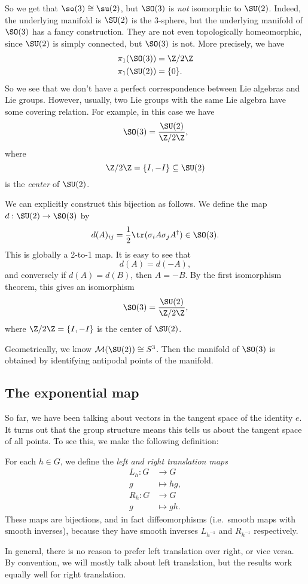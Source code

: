 \documentclass[a4paper]{article}
\begin{document}
So we get that $\so(3) \cong \su(2)$, but $\SO(3)$ is \emph{not} isomorphic to $\SU(2)$. Indeed, the underlying manifold is $\SU(2)$ is the $3$-sphere, but the underlying manifold of $\SO(3)$ has a fancy construction. They are not even topologically homeomorphic, since $\SU(2)$ is simply connected, but $\SO(3)$ is not. More precisely, we have
\begin{align*}
  \pi_1(\SO(3)) &= \Z/2\Z\\
  \pi_1(\SU(2)) &= \{0\}.
\end{align*}
So we see that we don't have a perfect correspondence between Lie algebras and Lie groups. However, usually, two Lie groups with the same Lie algebra have some covering relation. For example, in this case we have
\[
  \SO(3) = \frac{\SU(2)}{\Z/2\Z},
\]
where
\[
  \Z/2\Z = \{I, -I\} \subseteq \SU(2)
\]
is the \emph{center} of $\SU(2)$.

We can explicitly construct this bijection as follows. We define the map $d: \SU(2) \to \SO(3)$ by
\[
  d(A)_{ij} = \frac{1}{2} \tr (\sigma_i A\sigma_j A^\dagger) \in \SO(3).
\]
This is globally a 2-to-1 map. It is easy to see that
\[
  d(A) = d(-A),
\]
and conversely if $d(A) = d(B)$, then $A = -B$. By the first isomorphism theorem, this gives an isomorphism
\[
  \SO(3) = \frac{\SU(2)}{\Z/2\Z},
\]
where $\Z/2\Z = \{I, -I\}$ is the center of $\SU(2)$.

Geometrically, we know $\mathcal{M}(\SU(2)) \cong S^3$. Then the manifold of $\SO(3)$ is obtained by identifying antipodal points of the manifold.

\subsection{The exponential map}
So far, we have been talking about vectors in the tangent space of the identity $e$. It turns out that the group structure means this tells us about the tangent space of all points. To see this, we make the following definition:

\begin{defi}
  For each $h \in G$, we define the \emph{left and right translation maps}
  \begin{align*}
    L_h: G &\to G\\
    g &\mapsto hg,\\
    R_h: G &\to G\\
    g &\mapsto gh.
  \end{align*}
  These maps are bijections, and in fact diffeomorphisms (i.e.\ smooth maps with smooth inverses), because they have smooth inverses $L_{h^{-1}}$ and $R_{h^{-1}}$ respectively.
\end{defi}
In general, there is no reason to prefer left translation over right, or vice versa. By convention, we will mostly talk about left translation, but the results work equally well for right translation.
\end{document}
